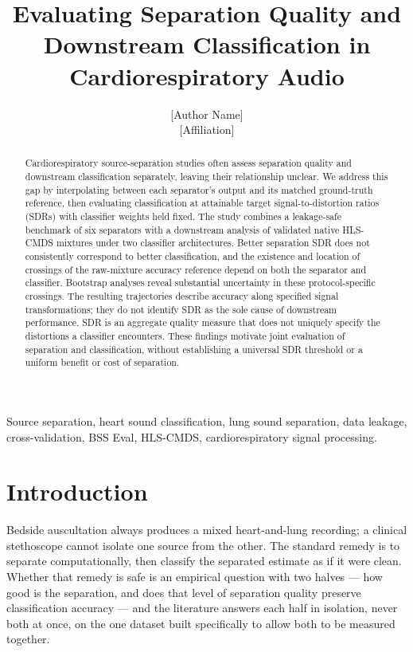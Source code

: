 \documentclass[journal]{IEEEtran}
\begin{document}
\title{Evaluating Separation Quality and Downstream Classification in Cardiorespiratory Audio}

\author{[Author Name]\\ \small [Affiliation]}

\maketitle

\begin{abstract}
Cardiorespiratory source-separation studies often assess separation quality and downstream classification separately, leaving their relationship unclear. We address this gap by interpolating between each separator's output and its matched ground-truth reference, then evaluating classification at attainable target signal-to-distortion ratios (SDRs) with classifier weights held fixed. The study combines a leakage-safe benchmark of six separators with a downstream analysis of validated native HLS-CMDS mixtures under two classifier architectures. Better separation SDR does not consistently correspond to better classification, and the existence and location of crossings of the raw-mixture accuracy reference depend on both the separator and classifier. Bootstrap analyses reveal substantial uncertainty in these protocol-specific crossings. The resulting trajectories describe accuracy along specified signal transformations; they do not identify SDR as the sole cause of downstream performance. SDR is an aggregate quality measure that does not uniquely specify the distortions a classifier encounters. These findings motivate joint evaluation of separation and classification, without establishing a universal SDR threshold or a uniform benefit or cost of separation.
\end{abstract}

\begin{IEEEkeywords}
Source separation, heart sound classification, lung sound separation, data leakage, cross-validation, BSS Eval, HLS-CMDS, cardiorespiratory signal processing.
\end{IEEEkeywords}

\section{Introduction}

Bedside auscultation always produces a mixed heart-and-lung recording; a clinical stethoscope cannot isolate one source from the other. The standard remedy is to separate computationally, then classify the separated estimate as if it were clean. Whether that remedy is safe is an empirical question with two halves --- how good is the separation, and does that level of separation quality preserve classification accuracy --- and the literature answers each half in isolation, never both at once, on the one dataset built specifically to allow both to be measured together.
\end{document}
